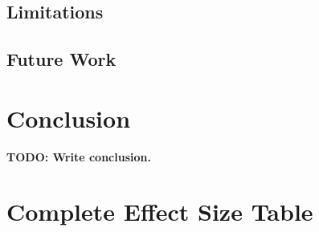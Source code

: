 \documentclass{article}
\begin{document}

\subsection{Limitations}


\subsection{Future Work}




\section{Conclusion}


\textbf{TODO: Write conclusion.}








\appendix

\section{Complete Effect Size Table}
\label{app:effects}
% 
\end{document}
